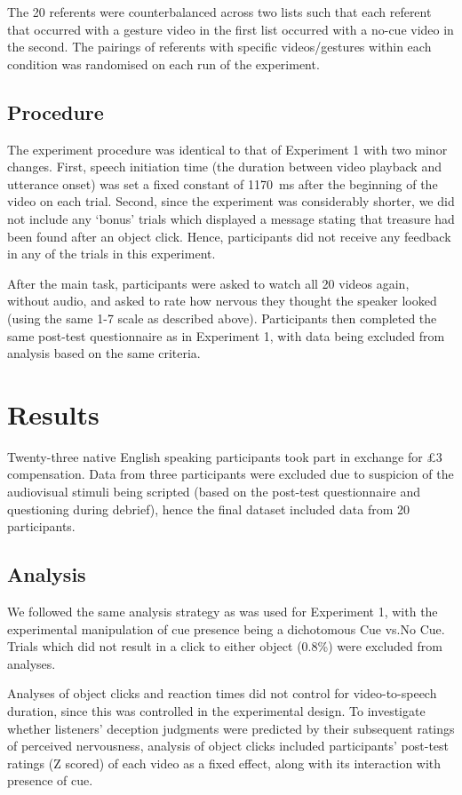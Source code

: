 \documentclass[a4paper,man,natbib]{apa6}
\begin{document}
The 20 referents were counterbalanced across two lists such that each referent that occurred with a gesture video in the first list occurred with a no-cue video in the second.
The pairings of referents with specific videos/gestures within each condition was randomised on each run of the experiment.

\subsection{Procedure}
The experiment procedure was identical to that of Experiment 1 with two minor changes.
First, speech initiation time (the duration between video playback and utterance onset) was set a fixed constant of 1170~ms after the beginning of the video on each trial.
Second, since the experiment was considerably shorter, we did not include any `bonus' trials which displayed a message stating that treasure had been found after an object click.
Hence, participants did not receive any feedback in any of the trials in this experiment.

After the main task, participants were asked to watch all 20 videos again, without audio, and asked to rate how nervous they thought the speaker looked (using the same 1-7 scale as described above).
Participants then completed the same post-test questionnaire as in Experiment 1, with data being excluded from analysis based on the same criteria.

\section{Results}
Twenty-three native English speaking participants took part in exchange for \pounds{}3 compensation. 
Data from three participants were excluded due to suspicion of the audiovisual stimuli being scripted (based on the post-test questionnaire and questioning during debrief), hence the final dataset included data from 20 participants.

\subsection{Analysis}
We followed the same analysis strategy as was used for Experiment 1, with the experimental manipulation of cue presence being a dichotomous Cue vs.\@ No Cue.
Trials which did not result in a click to either object (0.8\%) were excluded from analyses.

Analyses of object clicks and reaction times did not control for video-to-speech duration, since this was controlled in the experimental design.
To investigate whether listeners' deception judgments were predicted by their subsequent ratings of perceived nervousness, analysis of object clicks included participants' post-test ratings (Z scored) of each video as a fixed effect, along with its interaction with presence of cue.
\end{document}
